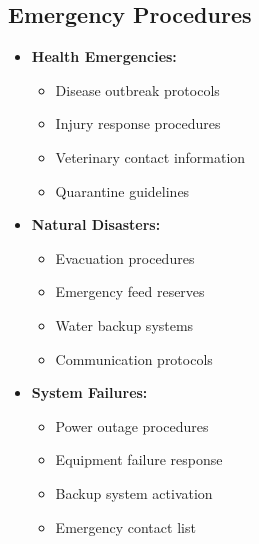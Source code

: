 \subsection{Emergency Procedures}
\begin{itemize}
    \item \textbf{Health Emergencies:}
    \begin{itemize}
        \item Disease outbreak protocols
        \item Injury response procedures
        \item Veterinary contact information
        \item Quarantine guidelines
    \end{itemize}
    
    \item \textbf{Natural Disasters:}
    \begin{itemize}
        \item Evacuation procedures
        \item Emergency feed reserves
        \item Water backup systems
        \item Communication protocols
    \end{itemize}
    
    \item \textbf{System Failures:}
    \begin{itemize}
        \item Power outage procedures
        \item Equipment failure response
        \item Backup system activation
        \item Emergency contact list
    \end{itemize}
\end{itemize}

